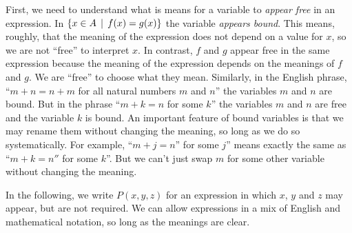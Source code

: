 First, we need to understand what is means for a variable to \emph{appear free} in an expression.
In $\{x\in A \,\mid\, f(x)=g(x)\}$ the variable \emph{appears bound}.
This means, roughly, that the meaning of the expression does not depend on a value for $x$, so we are not ``free'' to interpret $x$.
In contrast, $f$ and $g$ appear free in the same expression because the meaning of the expression depends on the meanings of $f$ and $g$.
We are ``free'' to choose what they mean.
Similarly, in the English phrase, ``$m + n = n + m$ for all natural numbers $m$ and $n$'' the variables $m$ and $n$ are bound.
But in the phrase ``$m+k = n$ for some $k$'' the variables $m$ and $n$ are free and the variable $k$ is bound.
An important feature of bound variables is that we may rename them without changing the meaning, so long as we do so systematically.
For example, ``$m+j=n$'' for some $j$'' means exactly the same as ``$m+k=n''$ for some $k$''.
But we can't just swap $m$ for some other variable without changing the meaning. 

In the following, we write $P(x,y,z)$ for an expression in which $x$, $y$ and $z$ may appear, but are not required. 
We can allow expressions in a mix of English and mathematical notation, so long as the meanings are clear.

